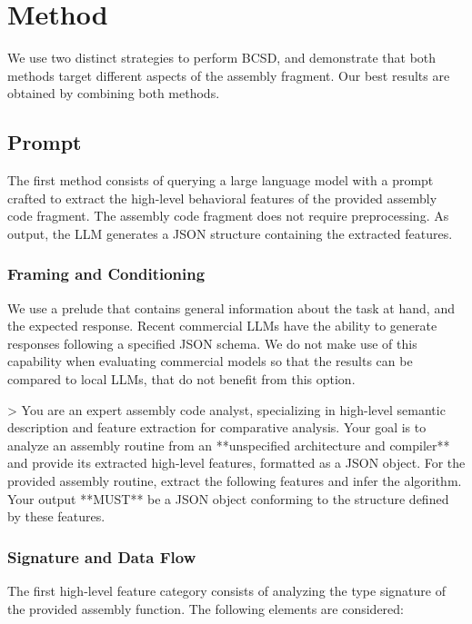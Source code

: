 \documentclass[conference,compsoc]{IEEEtran}
\begin{document}
\section{Method}

We use two distinct strategies to perform BCSD, and demonstrate that both methods target different aspects of the assembly fragment.
Our best results are obtained by combining both methods.

\subsection{Prompt}

The first method consists of querying a large language model with a prompt crafted to extract the high-level behavioral features of
the provided assembly code fragment. The assembly code fragment does not require preprocessing. As output, the LLM generates a JSON
structure containing the extracted features.

\subsubsection{Framing and Conditioning}

We use a prelude that contains general information about the task at hand, and the expected response.
Recent commercial LLMs have the ability to generate responses following a specified JSON schema. We do not
make use of this capability when evaluating commercial models so that the results can be compared to local LLMs,
that do not benefit from this option.

> You are an expert assembly code analyst, specializing in high-level semantic description and feature extraction for comparative analysis. Your goal is to analyze an assembly routine from an **unspecified architecture and compiler** and provide its extracted high-level features, formatted as a JSON object.
For the provided assembly routine, extract the following features and infer the algorithm. Your output **MUST** be a JSON object conforming to the structure
defined by these features.

\subsubsection{Signature and Data Flow}

The first high-level feature category consists of analyzing the type signature of the provided assembly function.
The following elements are considered:
\end{document}

